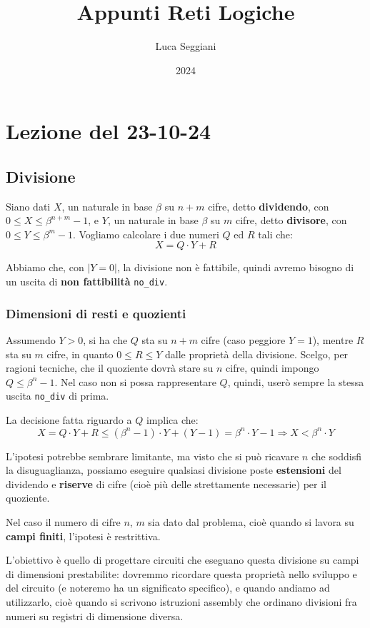 \documentclass[a4paper,11pt]{article}
\title{Appunti Reti Logiche}
\author{Luca Seggiani}
\date{2024}
\begin{document}
\section{Lezione del 23-10-24}

\thispagestyle{empty}
\pagestyle{fancy}

\subsection{Divisione}
Siano dati $X$, un naturale in base $\beta$ su $n+m$ cifre, detto \textbf{dividendo}, con $0 \leq X \leq \beta^{n+m}-1$,
e $Y$, un naturale in base $\beta$ su $m$ cifre, detto \textbf{divisore}, con $0 \leq Y \leq \beta^m -1$.
Vogliamo calcolare i due numeri $Q$ ed $R$ tali che:
$$ X = Q \cdot Y + R$$

Abbiamo che, con $|Y=0|$, la divisione non è fattibile, quindi avremo bisogno di un uscita di \textbf{non fattibilità} \lstinline|no_div|.

\subsubsection{Dimensioni di resti e quozienti}
Assumendo $Y > 0$, si ha che $Q$ sta su $n+m$ cifre (caso peggiore $Y = 1$), mentre $R$ sta su $m$ cifre, in quanto $0 \leq R \leq Y$ dalle proprietà della divisione.
Scelgo, per ragioni tecniche, che il quoziente dovrà stare su $n$ cifre, quindi impongo $Q \leq \beta^n -1$.
Nel caso non si possa rappresentare $Q$, quindi, userò sempre la stessa uscita \lstinline|no_div| di prima.

La decisione fatta riguardo a $Q$ implica che:
$$ 
X = Q \cdot Y + R \leq (\beta^n - 1) \cdot Y + (Y - 1) = \beta^n \cdot Y - 1 \Rightarrow X < \beta^n \cdot Y
$$

L'ipotesi potrebbe sembrare limitante, ma visto che si può ricavare $n$ che soddisfi la disuguaglianza, possiamo eseguire qualsiasi divisione poste \textbf{estensioni} del dividendo e \textbf{riserve} di cifre (cioè più delle strettamente necessarie) per il quoziente.

Nel caso il numero di cifre $n$, $m$ sia dato dal problema, cioè quando si lavora su \textbf{campi finiti}, l'ipotesi è restrittiva.

L'obiettivo è quello di progettare circuiti che eseguano questa divisione su campi di dimensioni prestabilite: dovremmo ricordare questa proprietà nello sviluppo e del circuito (e noteremo ha un significato specifico), e quando andiamo ad utilizzarlo, cioè quando si scrivono istruzioni assembly che ordinano divisioni fra numeri su registri di dimensione diversa.
\end{document}

